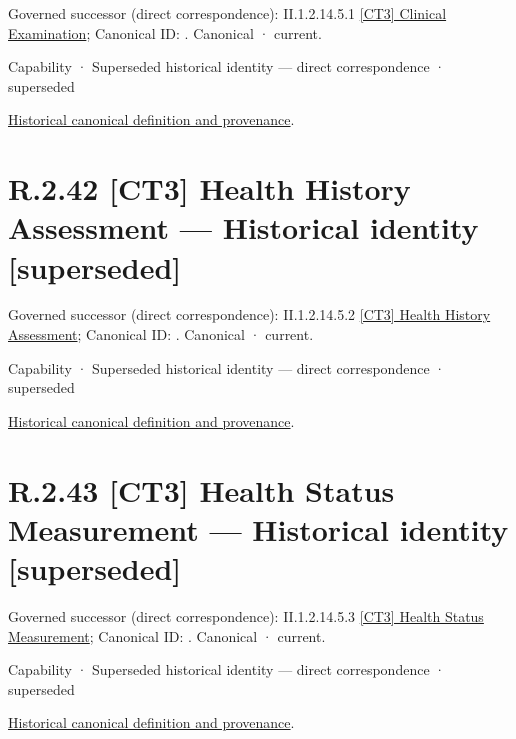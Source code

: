 {\small Governed successor (direct correspondence): II.1.2.14.5.1 \hyperref[element:8855d4d9e2954e0ab66ab65a556fc61a]{[CT3] Clinical Examination}; Canonical ID: \texttt{}. Canonical · current.}\par
\label{element:8bc15e2b8f114deebcbbe3f2013a8147}
{\small Capability · Superseded historical identity — direct correspondence · superseded}\par
\href{../../../../../../../continuum/strategy/capability/8bc15e2b8f114deebcbbe3f2013a8147.md}{Historical canonical definition and provenance}.\par
\section*{R.2.42 [CT3] Health History Assessment — Historical identity [superseded]}
\label{navigation:R.2.42}

{\small Governed successor (direct correspondence): II.1.2.14.5.2 \hyperref[element:7ea7e3f74e2940a7934b588a1a038834]{[CT3] Health History Assessment}; Canonical ID: \texttt{}. Canonical · current.}\par
\label{element:bcaacf446f45443eafd8e21a1fd74ee1}
{\small Capability · Superseded historical identity — direct correspondence · superseded}\par
\href{../../../../../../../continuum/strategy/capability/bcaacf446f45443eafd8e21a1fd74ee1.md}{Historical canonical definition and provenance}.\par
\section*{R.2.43 [CT3] Health Status Measurement — Historical identity [superseded]}
\label{navigation:R.2.43}

{\small Governed successor (direct correspondence): II.1.2.14.5.3 \hyperref[element:a796bfb3335d44f6aeb9970628ed8554]{[CT3] Health Status Measurement}; Canonical ID: \texttt{}. Canonical · current.}\par
\label{element:3717906f7f8840d3a8a3e3877543dd18}
{\small Capability · Superseded historical identity — direct correspondence · superseded}\par
\href{../../../../../../../continuum/strategy/capability/3717906f7f8840d3a8a3e3877543dd18.md}{Historical canonical definition and provenance}.\par
